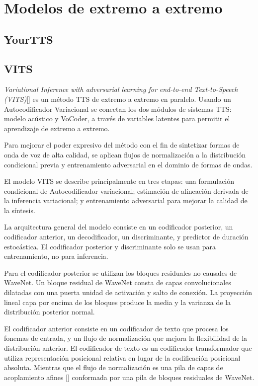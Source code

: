 \section{Modelos de extremo a extremo}

\subsection{YourTTS}

\subsection{VITS}

\textit{Variational Inference with adversarial learning for end-to-end Text-to-Speech (VITS)}[\cite{kim2021conditional}] es un método TTS de extremo a extremo en paralelo. Usando un Autocodificador Variacional se conectan los dos módulos de sistemas TTS: modelo acústico y VoCoder, a través de variables latentes para permitir el aprendizaje de extremo a extremo. 

Para mejorar el poder expresivo del método con el fin de sintetizar formas de onda de voz de alta calidad, se aplican flujos de normalización a la distribución condicional previa y entrenamiento adversarial en el dominio de formas de ondas.

El modelo VITS se describe principalmente en tres etapas: una formulación condicional de Autocodificador variacional; estimación de alineación derivada de la inferencia variacional; y entrenamiento adversarial para mejorar la calidad de la síntesis.

La arquitectura general del modelo consiste en un codificador posterior, un codificador anterior, un decodificador, un discriminante, y predictor de duración estocástica. El codificador posterior y discriminante solo se usan para entrenamiento, no para inferencia.

Para el codificador posterior se utilizan los bloques residuales no causales de WaveNet. Un bloque residual de WaveNet consta de capas convolucionales dilatadas con una puerta unidad de activación y salto de conexión. La proyección lineal
capa por encima de los bloques produce la media y la varianza de
la distribución posterior normal.

El codificador anterior consiste en un codificador de texto que procesa los fonemas de entrada, y un flujo de normalización que mejora la flexibilidad de la distribución anterior. El codificador de texto es un codificador transformador que utiliza representación posicional relativa en lugar de la codificación posicional absoluta. Mientras que el flujo de normalización es una pila de capas de acoplamiento afines [\cite{dinh2016density}] conformada por una pila de bloques residuales de WaveNet. 


